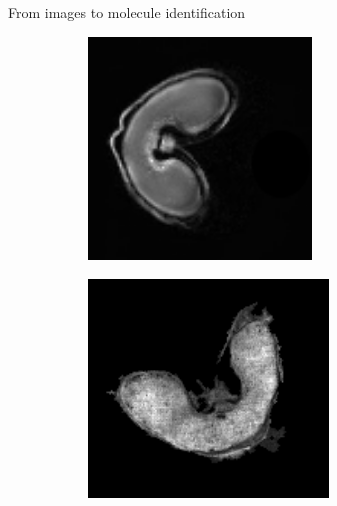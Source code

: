 \documentclass[10pt]{beamer}
\begin{document}
\begin{frame}{From images to molecule identification}
  \vspace{-0.2cm}
  \begin{figure}[ht]
    \centering
    \begin{subfigure}[t]{0.4\textwidth}
      \centering \includegraphics[width=0.65\textwidth]{fig/mri_slice11}
      \caption{}
      \label{subfig:mri}
    \end{subfigure}%
    \begin{subfigure}[t]{0.4\textwidth}
      \centering \includegraphics[width=0.7\textwidth]{fig/maldi}
      \caption{}
      \label{subfig:maldi}
    \end{subfigure}%
    \label{fig:irm_vs_maldi}
  \end{figure}
  
\end{frame}
\end{document}

